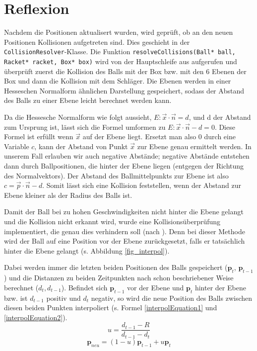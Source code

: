 \section{Reflexion}
\label{Kapitel_4_-_Unterkapitel_2}

Nachdem die Positionen aktualisert wurden, wird geprüft, ob an den neuen Positionen Kollisionen aufgetreten sind. Dies geschieht in der {\texttt{CollisionResolver}}-Klasse. Die Funktion {\texttt{resolveCollisions(Ball* ball, Racket* racket, Box* box)}} wird von der Hauptschleife aus aufgerufen und überprüft zuerst die Kollision des Balls mit der Box bzw. mit den 6 Ebenen der Box und dann die Kollision mit dem Schläger.
Die Ebenen werden in einer Hesseschen Normalform ähnlichen Darstellung gespeichert, sodass der Abstand des Balls zu einer Ebene leicht berechnet werden kann.


Da die Hessesche Normalform wie folgt aussieht, $ E: \vec x \cdot \vec n  = d $, und d der Abstand zum Ursprung ist, lässt sich die Formel umformen zu $ E: \vec x \cdot \vec n  - d = 0$. Diese Formel ist erfüllt wenn $\vec x$ auf der Ebene liegt. Ersetzt man also 0 durch eine Variable $c$, kann der Abstand von Punkt $\vec x$ zur Ebene genau ermittelt werden. In unserem Fall erlauben wir auch negative Abstände; negative Abstände entstehen dann durch Ballpositionen, die hinter der Ebene liegen (entgegen der Richtung des Normalvektors).
Der Abstand des Ballmittelpunkts zur Ebene ist also $c = \vec p\cdot \vec n - d $. Somit lässt sich eine Kollision feststellen, wenn der Abstand zur Ebene kleiner als der Radius des Balls ist.

Damit der Ball bei zu hohen Geschwindigkeiten nicht hinter die Ebene gelangt und die Kollision nicht erkannt wird, wurde eine Kollisionsüberprüfung implementiert, die genau dies verhindern soll (nach \cite{migGom:1999}). Denn bei dieser Methode wird der Ball auf eine Position vor der Ebene zurückgesetzt, falls er tatsächlich hinter die Ebene gelangt (s. Abbildung \ref{fig_interpol}). 

Dabei werden immer die letzten beiden Positionen des Balls gespeichert ($\mathbf{p}_t$, $\mathbf{p}_{t-1}$) und die Distanzen zu beiden Zeitpunkten nach schon beschriebener Weise berechnet ($d_t, d_{t-1}$).
Befindet sich $\mathbf{p}_{t-1}$ vor der Ebene und $\mathbf{p}_t$ hinter der Ebene bzw. ist $d_{t-1}$ positiv und $d_t$ negativ, so wird die neue Position des Balls zwischen diesen beiden Punkten interpoliert (s. Formel \ref{interpolEquation1} und \ref{interpolEquation2}). 
\begin{equation}	
\label{interpolEquation1}
	u = \frac{d_{t-1} - R}{d_{t-1} - d_t}
\end{equation}
\begin{equation}	
\label{interpolEquation2}
	\mathbf{p}_{neu} = (1-u)\mathbf{p}_{t-1} + u\mathbf{p}_t
\end{equation}

